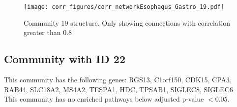 \begin{figure}[h!]
\centering
\texttt{[image: corr\_figures/corr\_networkEsophagus\_Gastro\_19.pdf]}
\caption{Community 19 structure. Only showing connections with correlation greater than 0.8}
\end{figure}




\subsection*{Community with ID 22}
This community has the following genes: RGS13, C1orf150, CDK15, CPA3, RAB44, SLC18A2, MS4A2, TESPA1, HDC, TPSAB1, SIGLEC8, SIGLEC6
\\
This community has no enriched pathways below adjusted p-value $< 0.05$.

